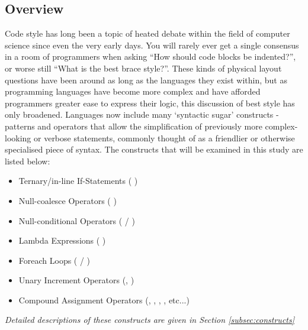 \documentclass{article}
\begin{document}
    \subsection{Overview}
    \label{sec:overview}
        Code style has long been a topic of heated debate within the field of computer science since even the very early days. You will rarely ever get a single consensus in a room of programmers when asking ``How should code blocks be indented?'', or worse still ``What is the best brace style?''. These kinds of physical layout questions have been around as long as the languages they exist within, but as programming languages have become more complex and have afforded programmers greater ease to express their logic, this discussion of best style has only broadened. Languages now include many `syntactic sugar' constructs - patterns and operators that allow the simplification of previously more complex-looking or verbose statements, commonly thought of as a friendlier or otherwise specialised piece of syntax. The constructs that will be examined in this study are listed below:

        \begin{itemize}
            \item Ternary/in-line If-Statements (  )
            \item Null-coalesce Operators (  )
            \item Null-conditional Operators (  / )
            \item Lambda Expressions (  )
            \item Foreach Loops (  / )
            \item Unary Increment Operators (, )
            \item Compound Assignment Operators (,  , , , etc...)
        \end{itemize}
        
        \emph{Detailed descriptions of these constructs are given in Section \ref{subsec:constructs}}\\
\end{document}
